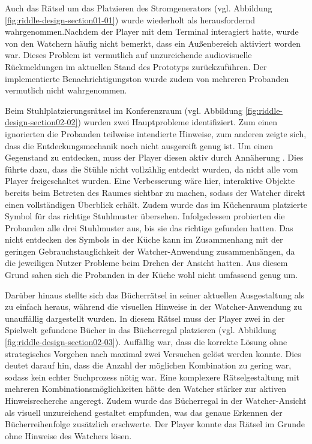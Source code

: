 Auch das Rätsel um das Platzieren des Stromgenerators  (vgl. Abbildung \ref{fig:riddle-design-section01-01}) wurde wiederholt als herausfordernd wahrgenommen.Nachdem der Player mit dem Terminal interagiert hatte, wurde von den Watchern häufig nicht bemerkt, dass ein Außenbereich aktiviert worden war. Dieses Problem ist vermutlich auf unzureichende audiovisuelle Rückmeldungen im aktuellen Stand des Prototyps zurückzuführen. Der implementierte Benachrichtigungston wurde zudem von mehreren Probanden vermutlich nicht wahrgenommen.

Beim Stuhlplatzierungsrätsel im Konferenzraum (vgl. Abbildung \ref{fig:riddle-design-section02-02}) wurden zwei Hauptprobleme identifiziert. Zum einen ignorierten die Probanden teilweise intendierte Hinweise, zum anderen zeigte sich, dass die Entdeckungsmechanik noch nicht ausgereift genug ist. Um einen Gegenstand zu entdecken, muss der Player diesen aktiv durch Annäherung . Dies führte dazu, dass die Stühle nicht vollzählig entdeckt wurden, da nicht alle vom Player freigeschaltet wurden. Eine Verbesserung wäre hier, interaktive Objekte bereits beim Betreten des Raumes sichtbar zu machen, sodass der Watcher direkt einen vollständigen Überblick erhält. Zudem wurde das im Küchenraum platzierte Symbol für das richtige Stuhlmuster übersehen. Infolgedessen probierten die Probanden alle drei Stuhlmuster aus, bis sie das richtige gefunden hatten. Das nicht entdecken des Symbols in der Küche kann im Zusammenhang mit der geringen Gebrauchstauglichkeit der Watcher-Anwendung zusammenhängen, da die jeweiligen Nutzer Probleme beim Drehen der Ansicht hatten. Aus diesem Grund sahen sich die Probanden in der Küche wohl nicht umfassend genug um.

Darüber hinaus stellte sich das Bücherrätsel in seiner aktuellen Ausgestaltung als zu einfach heraus, während die visuellen Hinweise in der Watcher-Anwendung zu unauffällig dargestellt wurden. In diesem Rätsel muss der Player zwei in der Spielwelt gefundene Bücher in das Bücherregal platzieren   (vgl. Abbildung \ref{fig:riddle-design-section02-03}). Auffällig war, dass die korrekte Lösung ohne strategisches Vorgehen nach maximal zwei Versuchen gelöst werden konnte. Dies deutet darauf hin, dass die Anzahl der möglichen Kombination zu gering war, sodass kein echter Suchprozess nötig war. Eine komplexere Rätselgestaltung mit mehreren Kombinationsmöglichkeiten hätte den Watcher stärker zur aktiven Hinweisrecherche angeregt. Zudem wurde das Bücherregal in der Watcher-Ansicht als visuell unzureichend gestaltet empfunden, was das genaue Erkennen der Bücherreihenfolge zusätzlich erschwerte. Der Player konnte das Rätsel im Grunde ohne Hinweise des Watchers lösen.

